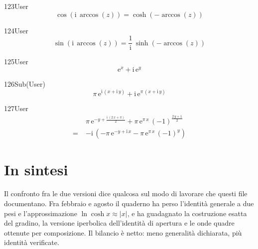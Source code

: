 \begin{espr}{123}{User}{\verificata}
\[
\cos\!\left(\mathrm{i}\, \arccos\!\left(z\right)\right) = \cosh\!\left(-\arccos\!\left(z\right)\right)
\]
\end{espr}
\begin{espr}{124}{User}{\verificata}
\[
\sin\!\left(\mathrm{i}\, \arccos\!\left(z\right)\right) = \frac{1}{\mathrm{i}}\, \sinh\!\left(-\arccos\!\left(z\right)\right)
\]
\end{espr}
\begin{espr}{125}{User}{}
\[
\mathrm{e}^{x} + \mathrm{i}\, \mathrm{e}^{y}
\]
\end{espr}
\begin{espr}{126}{Sub(User)}{}
\[
\pi\, \mathrm{e}^{\mathrm{i}\, \left(x + \mathrm{i}\, y\right)} + \mathrm{i}\, \mathrm{e}^{\pi\, \left(x + \mathrm{i}\, y\right)}
\]
\end{espr}
\begin{espr}{127}{User}{\verificata}
\begin{align*}
& \pi\, \mathrm{e}^{-y + \frac{\mathrm{i}\, \left(2\, x + \pi\right)}{2}} + \pi\, \mathrm{e}^{\pi\, x}\, \left(-1\right)^{\frac{2\, y + 1}{2}} \\
=\;& -\mathrm{i}\, \left(-\pi\, \mathrm{e}^{-y + \mathrm{i}\, x} - \pi\, \mathrm{e}^{\pi\, x}\, \left(-1\right)^{y}\right)
\end{align*}
\end{espr}
\section*{In sintesi}

Il confronto fra le due versioni dice qualcosa sul modo di lavorare che questi file documentano. Fra febbraio e agosto il quaderno ha perso l'identità generale a due pesi e l'approssimazione $\ln\cosh x\approx|x|$, e ha guadagnato la costruzione esatta del gradino, la versione iperbolica dell'identità di apertura e le onde quadre ottenute per composizione. Il bilancio è netto: meno generalità dichiarata, più identità verificate.

